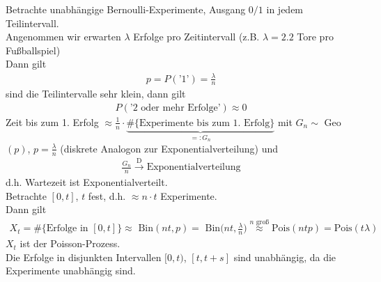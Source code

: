 \documentclass[a4paper,openany]{book}
\theoremstyle{mytheoremstyle}
\theoremstyle{mytheoremstyle2}
\begin{document}
\begin{center}
\end{center}
Betrachte unabhängige Bernoulli-Experimente, Ausgang $0/1$ in jedem Teilintervall.  \\
Angenommen wir erwarten $\lambda $ Erfolge pro Zeitintervall (z.B. $\lambda =2.2$ Tore pro Fußballspiel) \\
Dann gilt 
\begin{align*}
  p=P(\text{'$1$'})=\frac{\lambda }{n}
\end{align*}
sind die Teilintervalle sehr klein, dann gilt
\begin{align*}
  P(\text{'$2$ oder mehr Erfolge'})\approx 0
\end{align*}
Zeit bis zum 1. Erfolg $\approx \frac{1}{n} \cdot \underbrace{\text{\#\{Experimente bis zum 1. Erfolg\}}}_{=:G_n}$ mit $G_n\sim$ Geo$(p)$, $p=\frac{\lambda }{n}$ (diskrete Analogon zur Exponentialverteilung) und 
\begin{align*}
  \frac{G_n}{n}\overset{\text{D}}\to \text{Exponentialverteilung}
\end{align*}
d.h. Wartezeit ist Exponentialverteilt. \\
Betrachte $[0,t]$, $t$ fest, d.h. $\approx n \cdot t$ Experimente. \\
Dann gilt
\begin{align*}
  X_t=\text{\#\{Erfolge in $[0,t]$\}}\approx \text{ Bin}(nt,p)=\text{ Bin}\bigg(nt,\frac{\lambda }{n}\bigg)\overset{n \text{ groß}}\approx \text{Pois}(ntp)=\text{Pois}(t \lambda )
\end{align*}
$X_t$ ist der Poisson-Prozess. \\
Die Erfolge in disjunkten Intervallen $[0,t)$, $[t,t+s]$ sind unabhängig, da die Experimente unabhängig sind. 
\end{document}
